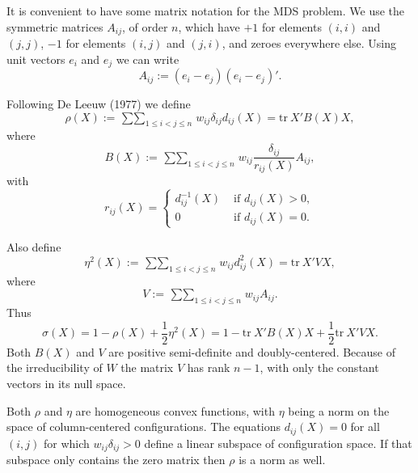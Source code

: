 \documentclass[
  12pt,
]{article}
\begin{document}
It is convenient to have some matrix notation for the MDS problem.
We use the symmetric matrices \(A_{ij}\), of order \(n\), which have \(+1\) for elements \((i,i)\) and \((j,j)\), \(-1\) for elements \((i,j)\) and \((j,i)\), and zeroes everywhere else. Using unit vectors \(e_i\) and \(e_j\) we can write
\begin{equation}
A_{ij}:=(e_i-e_j)(e_i-e_j)'.
\label{eq:adef}
\end{equation}

Following De Leeuw (1977) we define
\begin{equation}
\rho(X):=\mathop{\sum\sum}_{1\leq i<j\leq n} w_{ij}\delta_{ij}d_{ij}(X)=\text{tr}\ X'B(X)X,
\label{eq:rhodef}
\end{equation}
where
\begin{equation}
B(X):=\mathop{\sum\sum}_{1\leq i<j\leq n}w_{ij}\frac{\delta_{ij}}{r_{ij}(X)}A_{ij},
\label{eq:bdef}
\end{equation}
with
\begin{equation}
r_{ij}(X)=\begin{cases}
d_{ij}^{-1}(X)&\text{ if }d_{ij}(X)>0,\\
0&\text{ if }d_{ij}(X)=0.
\end{cases}
\label{eq:rdef}
\end{equation}

Also define
\begin{equation}
\eta^2(X):=\mathop{\sum\sum}_{1\leq i<j\leq n}w_{ij}d_{ij}^2(X)=\text{tr}\ X'VX,
\label{eq:etadef}
\end{equation}
where
\begin{equation}
V:=\mathop{\sum\sum}_{1\leq i<j\leq n}w_{ij}A_{ij}.
\label{eq:vdef}
\end{equation}
Thus
\begin{equation}
\sigma(X)=1-\rho(X)+\frac12\eta^2(X)=1-\text{tr}\ X'B(X)X+\frac12\text{tr}\ X'VX.
\label{eq:sform}
\end{equation}
Both \(B(X)\) and \(V\) are positive semi-definite and doubly-centered. Because of the irreducibility of \(W\) the matrix \(V\) has rank \(n-1\), with only the constant vectors in its null space.

Both \(\rho\) and \(\eta\) are homogeneous convex functions, with \(\eta\) being a
norm on the space of column-centered configurations. The equations
\(d_{ij}(X)=0\) for all \((i,j)\) for which
\(w_{ij}\delta_{ij}>0\) define a linear subspace of configuration space. If that
subspace only contains the zero matrix then \(\rho\) is a norm as well.
\end{document}
